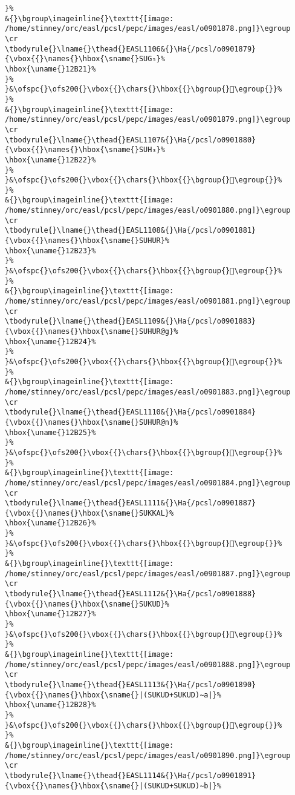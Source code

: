 \begin{verbatim}
}%
&{}\bgroup\imageinline{}\texttt{[image: /home/stinney/orc/easl/pcsl/pepc/images/easl/o0901878.png]}\egroup
\cr
\tbodyrule{}\lname{}\thead{}EASL1106&{}\Ha{/pcsl/o0901879}{\vbox{{}\names{}\hbox{\sname{}SUG₅}%
\hbox{\uname{}12B21}%
}%
}&\ofspc{}\ofs200{}\vbox{{}\chars{}\hbox{{}\bgroup{}𒬡\egroup{}}%
}%
&{}\bgroup\imageinline{}\texttt{[image: /home/stinney/orc/easl/pcsl/pepc/images/easl/o0901879.png]}\egroup
\cr
\tbodyrule{}\lname{}\thead{}EASL1107&{}\Ha{/pcsl/o0901880}{\vbox{{}\names{}\hbox{\sname{}SUH₃}%
\hbox{\uname{}12B22}%
}%
}&\ofspc{}\ofs200{}\vbox{{}\chars{}\hbox{{}\bgroup{}𒬢\egroup{}}%
}%
&{}\bgroup\imageinline{}\texttt{[image: /home/stinney/orc/easl/pcsl/pepc/images/easl/o0901880.png]}\egroup
\cr
\tbodyrule{}\lname{}\thead{}EASL1108&{}\Ha{/pcsl/o0901881}{\vbox{{}\names{}\hbox{\sname{}SUHUR}%
\hbox{\uname{}12B23}%
}%
}&\ofspc{}\ofs200{}\vbox{{}\chars{}\hbox{{}\bgroup{}𒬣\egroup{}}%
}%
&{}\bgroup\imageinline{}\texttt{[image: /home/stinney/orc/easl/pcsl/pepc/images/easl/o0901881.png]}\egroup
\cr
\tbodyrule{}\lname{}\thead{}EASL1109&{}\Ha{/pcsl/o0901883}{\vbox{{}\names{}\hbox{\sname{}SUHUR@g}%
\hbox{\uname{}12B24}%
}%
}&\ofspc{}\ofs200{}\vbox{{}\chars{}\hbox{{}\bgroup{}𒬤\egroup{}}%
}%
&{}\bgroup\imageinline{}\texttt{[image: /home/stinney/orc/easl/pcsl/pepc/images/easl/o0901883.png]}\egroup
\cr
\tbodyrule{}\lname{}\thead{}EASL1110&{}\Ha{/pcsl/o0901884}{\vbox{{}\names{}\hbox{\sname{}SUHUR@n}%
\hbox{\uname{}12B25}%
}%
}&\ofspc{}\ofs200{}\vbox{{}\chars{}\hbox{{}\bgroup{}𒬥\egroup{}}%
}%
&{}\bgroup\imageinline{}\texttt{[image: /home/stinney/orc/easl/pcsl/pepc/images/easl/o0901884.png]}\egroup
\cr
\tbodyrule{}\lname{}\thead{}EASL1111&{}\Ha{/pcsl/o0901887}{\vbox{{}\names{}\hbox{\sname{}SUKKAL}%
\hbox{\uname{}12B26}%
}%
}&\ofspc{}\ofs200{}\vbox{{}\chars{}\hbox{{}\bgroup{}𒬦\egroup{}}%
}%
&{}\bgroup\imageinline{}\texttt{[image: /home/stinney/orc/easl/pcsl/pepc/images/easl/o0901887.png]}\egroup
\cr
\tbodyrule{}\lname{}\thead{}EASL1112&{}\Ha{/pcsl/o0901888}{\vbox{{}\names{}\hbox{\sname{}SUKUD}%
\hbox{\uname{}12B27}%
}%
}&\ofspc{}\ofs200{}\vbox{{}\chars{}\hbox{{}\bgroup{}𒬧\egroup{}}%
}%
&{}\bgroup\imageinline{}\texttt{[image: /home/stinney/orc/easl/pcsl/pepc/images/easl/o0901888.png]}\egroup
\cr
\tbodyrule{}\lname{}\thead{}EASL1113&{}\Ha{/pcsl/o0901890}{\vbox{{}\names{}\hbox{\sname{}|(SUKUD+SUKUD)∼a|}%
\hbox{\uname{}12B28}%
}%
}&\ofspc{}\ofs200{}\vbox{{}\chars{}\hbox{{}\bgroup{}𒬨\egroup{}}%
}%
&{}\bgroup\imageinline{}\texttt{[image: /home/stinney/orc/easl/pcsl/pepc/images/easl/o0901890.png]}\egroup
\cr
\tbodyrule{}\lname{}\thead{}EASL1114&{}\Ha{/pcsl/o0901891}{\vbox{{}\names{}\hbox{\sname{}|(SUKUD+SUKUD)∼b|}%

\end{verbatim}
